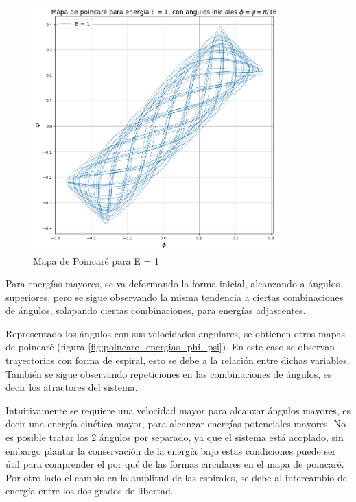 \documentclass[11pt, twoside]{article} %
\begin{document}
\begin{figure}[h!]
    \centering
    \includegraphics[width=0.85\textwidth]{plots/poincare_energias_1.png}
    \caption{Mapa de Poincaré para E = 1}
    \label{fig:poincare_energia_1}
\end{figure}

Para energías mayores, se va deformando la forma inicial, alcanzando a 
ángulos superiores, pero se sigue observando la misma tendencia a ciertas 
combinaciones de ángulos, solapando ciertas combinaciones, para energías
adjascentes.

Representado los ángulos con sus velocidades angulares, se obtienen otros 
mapas de poincaré (figura \ref{fig:poincare_energias_phi_psi}). En este caso
se observan trayectorias con forma de espiral, esto se debe a la relación entre
dichas variables. También se sigue observando repeticiones en las combinaciones
de ángulos, es decir los atractores del sistema.

Intuitivamente se requiere una velocidad mayor para alcanzar ángulos mayores,
es decir una energía cinética mayor, para alcanzar energías potenciales mayores. 
No es posible tratar los 2 ángulos por separado, ya que el sistema está acoplado, 
sin embargo plantar la conservación de la energía bajo estas condiciones 
puede ser útil para comprender el por qué de las formas circulares en el mapa de
poincaré. Por otro lado el cambio en la amplitud de las espirales, se debe al 
intercambio de energía entre los dos grados de libertad.
\end{document}
